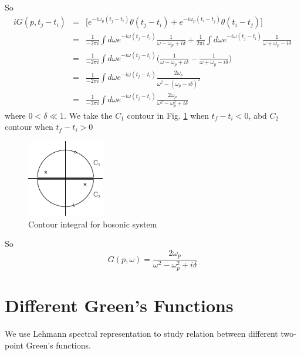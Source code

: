 \documentclass[12pt]{book}
\begin{document}
	So
	\begin{eqnarray}
		iG(p,t_j-t_i)&=&\big[e^{-i\omega_p(t_j-t_i)}\theta(t_j-t_i)+ e^{-i\omega_p(t_i-t_j)}\theta(t_i-t_j)\big]\\
		&=&\frac 1{-2\pi i}\int d\omega e^{-i\omega(t_j-t_i)}\frac 1{\omega-\omega_p+i\delta}+\frac 1{2\pi i}\int d\omega e^{-i\omega(t_j-t_i)}\frac 1{\omega+\omega_p-i\delta}\\
		&=&\frac 1{-2\pi i}\int d\omega e^{-i\omega(t_j-t_i)}\Big(\frac 1{\omega-\omega_p+i\delta}-\frac 1{\omega+\omega_p-i\delta}\Big)\\
		&=&\frac 1{-2\pi i}\int d\omega e^{-i\omega(t_j-t_i)}\frac{2\omega_p}{\omega^2-(\omega_p-i\delta)^2}\\
		&=&\frac 1{-2\pi i}\int d\omega e^{-i\omega(t_j-t_i)}\frac{2\omega_p}{\omega^2-\omega_p^2+i\delta}
	\end{eqnarray}
	where $0<\delta\ll 1$.  We take the $C_1$ contour in Fig. \ref{fig:contour_boson} when $t_f-t_i<0$, abd $C_2$ contour when $t_f-t_i>0$
	
	\begin{figure}[htb]
		\centering  
		\includegraphics[width=0.3\textwidth]{resources/chap_green_0T/contour2.pdf}
		\caption{Contour integral for bosonic system}
		\label{fig:contour_boson} 
	\end{figure}
	
	So
	\begin{equation}
		G(p,\omega)=\frac{2\omega_p}{\omega^2-\omega_p^2+i\delta}
	\end{equation}
	\section{Different Green's Functions}
	\label{sec:0t_green}
	We use Lehmann spectral representation to study relation between different two-point Green's functions.
	
\end{document}
